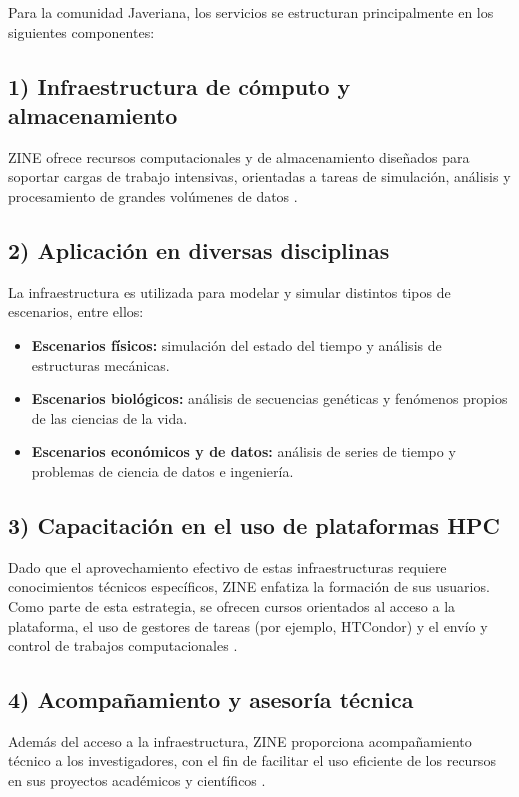 Para la comunidad Javeriana, los servicios se estructuran principalmente en los siguientes componentes:

\subsection*{1) Infraestructura de cómputo y almacenamiento}
ZINE ofrece recursos computacionales y de almacenamiento diseñados para soportar cargas de trabajo intensivas, orientadas a tareas de simulación, análisis y procesamiento de grandes volúmenes de datos \cite{zine_oficial,perfiles_capacidades_zine}.

\subsection*{2) Aplicación en diversas disciplinas}
La infraestructura es utilizada para modelar y simular distintos tipos de escenarios, entre ellos:
\begin{itemize}
  \item \textbf{Escenarios físicos:} simulación del estado del tiempo y análisis de estructuras mecánicas.
  \item \textbf{Escenarios biológicos:} análisis de secuencias genéticas y fenómenos propios de las ciencias de la vida.
  \item \textbf{Escenarios económicos y de datos:} análisis de series de tiempo y problemas de ciencia de datos e ingeniería.
\end{itemize}
\cite{perfiles_capacidades_zine}

\subsection*{3) Capacitación en el uso de plataformas HPC}
Dado que el aprovechamiento efectivo de estas infraestructuras requiere conocimientos técnicos específicos, ZINE enfatiza la formación de sus usuarios. Como parte de esta estrategia, se ofrecen cursos orientados al acceso a la plataforma, el uso de gestores de tareas (por ejemplo, HTCondor) y el envío y control de trabajos computacionales \cite{curso_hpc_python}.

\subsection*{4) Acompañamiento y asesoría técnica}
Además del acceso a la infraestructura, ZINE proporciona acompañamiento técnico a los investigadores, con el fin de facilitar el uso eficiente de los recursos en sus proyectos académicos y científicos \cite{perfiles_capacidades_zine,pesquisa_zine_2012}.

